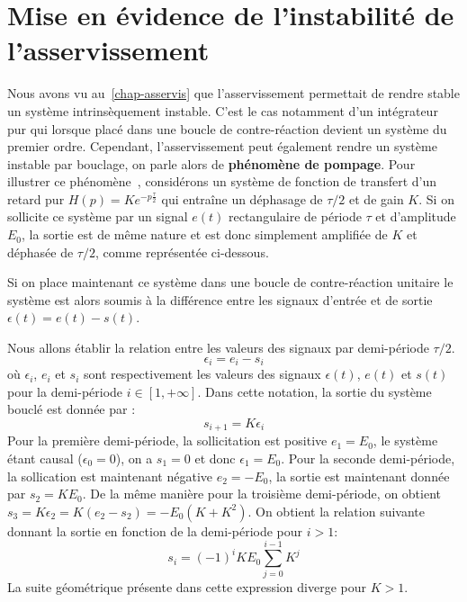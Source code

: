 \section[Instabilité de l'asservissement]
{Mise en évidence de l'instabilité de l'asservissement}
Nous avons vu au~\cref{chap-asservis} que l'asservissement permettait de
rendre stable un système intrinsèquement instable. C'est le cas notamment d'un 
intégrateur pur qui lorsque placé dans une boucle de contre-réaction devient
un système du premier ordre.
Cependant, l'asservissement peut également rendre un système instable par
bouclage, on parle alors de \textbf{phénomène de pompage}.
Pour illustrer ce phénomène~\cite{genouel}, considérons un système de fonction 
de transfert d'un retard pur $H(p)=Ke^{-p\frac{\tau}{2}}$ qui entraîne 
un déphasage de $\tau/2$ et de gain $K$. Si on sollicite ce système par un 
signal $e(t)$ rectangulaire de période $\tau$ et d'amplitude $E_0$, la sortie 
est de même nature et est donc simplement amplifiée de $K$ et déphasée 
de $\tau/2$, comme représentée ci-dessous.
\begin{center}
    
\end{center}
Si on place maintenant ce système dans une boucle de contre-réaction 
unitaire le système est alors soumis à la différence entre les signaux 
d'entrée et de sortie $\epsilon(t)=e(t)-s(t)$. 
\begin{center}
    
\end{center}
Nous allons établir la relation 
entre les valeurs des signaux par demi-période $\tau/2$. 
\[
    \epsilon_i=e_i-s_i
\]
où $\epsilon_i$, $e_i$ et $s_i$ sont respectivement les valeurs des signaux 
$\epsilon(t)$, $e(t)$ et $s(t)$ pour la demi-période $i\in[1,+\infty]$.
Dans cette notation, la sortie du système bouclé est donnée par : 
\[
    s_{i+1}=K\epsilon_i
\]
Pour la première demi-période, la sollicitation est positive $e_1=E_0$, 
le système étant causal ($\epsilon_0=0$), on a $s_1=0$ et donc $\epsilon_1=E_0$.
Pour la seconde demi-période, la sollication est maintenant négative $e_2=-E_0$,
la sortie est maintenant donnée par $s_2=KE_0$. De la même manière pour 
la troisième demi-période, on obtient $s_3=K\epsilon_2=K(e_2-s_2)=-E_0(K+K^2)$. 
On obtient la relation suivante donnant la sortie en fonction de la 
demi-période pour $i>1$:
\[
    s_i=(-1)^{i}KE_0\sum\limits_{j=0}^{i-1} K^j
\]
La suite géométrique présente dans cette expression diverge pour $K>1$.

